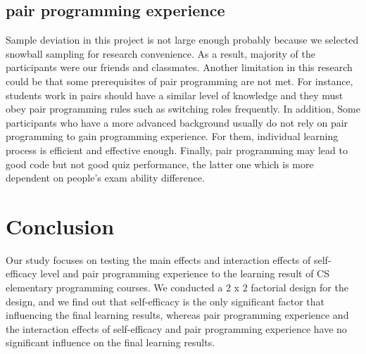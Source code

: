 \documentclass{sigchi}
\begin{document}
\subsection{pair programming experience}
Sample deviation in this project is not large enough probably because we selected snowball sampling for research convenience. As a result, majority of the participants were our friends and classmates. Another limitation in this research could be that some prerequisites of pair programming are not met.  For instance, students work in pairs should have a similar level of knowledge and they must obey pair programming rules such as switching roles frequently. In addition, Some participants who have a more advanced background usually do not rely on pair programming to gain programming experience. For them,  individual learning process is efficient and effective enough. Finally, pair programming may lead to good code but not good quiz performance, the latter one which is more dependent on people's exam ability difference.


\section{Conclusion}
Our study focuses on testing the main effects and interaction effects of self-efficacy level and pair programming experience to the learning result of CS elementary programming courses. We conducted a 2 x 2 factorial design for the design, and we find out that self-efficacy is the only significant factor that influencing the final learning results, whereas pair programming experience and the interaction effects of self-efficacy and pair programming experience have no significant influence on the final learning results.
\end{document}
